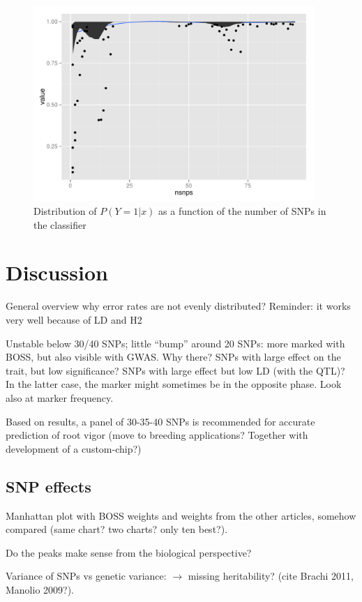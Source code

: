 \begin{figure}
\includegraphics[width=0.95\textwidth]{prob_roll3.pdf}
\caption{Distribution of $P(Y=1|x)$ as a function of the number of SNPs
  in the classifier}
\label{fig:probability} 
\end{figure}


\section{Discussion}
\label{sec:discussion}
General overview
why error rates are not evenly distributed?
Reminder: it works very well because of LD and H2

Unstable below 30/40 SNPs; little ``bump'' around 20 SNPs: more marked
with BOSS, but also visible with GWAS. Why there? SNPs with large effect
on the trait, but low significance? SNPs with large effect but low LD
(with the QTL)? In the latter case, the marker might sometimes be in the
opposite phase. Look also at marker frequency.

Based on results, a panel of 30-35-40 SNPs is recommended for accurate
prediction of root vigor (move to breeding applications? Together with
development of a custom-chip?)

\subsection{SNP effects}
Manhattan plot with BOSS weights and weights from the other articles,
somehow compared (same chart? two charts? only ten best?).

Do the peaks make sense from the biological perspective?

Variance of SNPs vs genetic variance: $\rightarrow$ missing
heritability? (cite Brachi 2011, Manolio 2009?).


